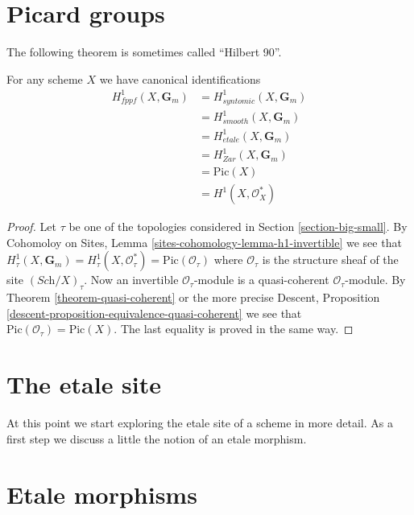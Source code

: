 \section{Picard groups}
\label{section-picard-groups}

\noindent
The following theorem is sometimes called ``Hilbert 90''.

\begin{theorem}
\label{theorem-picard-group}
For any scheme $X$ we have canonical identifications
\begin{align*}
H_{fppf}^1(X, \mathbf{G}_m) & = H^1_{syntomic}(X, \mathbf{G}_m) \\
& = H^1_{smooth}(X, \mathbf{G}_m) \\
& = H_{etale}^1(X, \mathbf{G}_m) \\
& = H^1_{Zar}(X, \mathbf{G}_m) \\
& = \text{Pic}(X) \\
& = H^1(X, \mathcal{O}_X^*)
\end{align*}
\end{theorem}

\begin{proof}
Let $\tau$ be one of the topologies considered in
Section \ref{section-big-small}.
By
Cohomoloy on Sites, Lemma \ref{sites-cohomology-lemma-h1-invertible}
we see that
$H^1_\tau(X, \mathbf{G}_m) =
H^1_\tau(X, \mathcal{O}_\tau^*) =
\text{Pic}(\mathcal{O}_\tau)$
where $\mathcal{O}_\tau$ is the structure sheaf of the site
$(\textit{Sch}/X)_\tau$. Now an invertible $\mathcal{O}_\tau$-module
is a quasi-coherent $\mathcal{O}_\tau$-module.
By Theorem \ref{theorem-quasi-coherent} or the more precise
Descent, Proposition \ref{descent-proposition-equivalence-quasi-coherent}
we see that $\text{Pic}(\mathcal{O}_\tau) = \text{Pic}(X)$.
The last equality is proved in the same way.
\end{proof}






\section{The etale site}
\label{section-etale-site}

\noindent
At this point we start exploring the etale site of a scheme in
more detail. As a first step we discuss a little the notion of an
etale morphism.





\section{Etale morphisms}
\label{section-etale-morphism}

